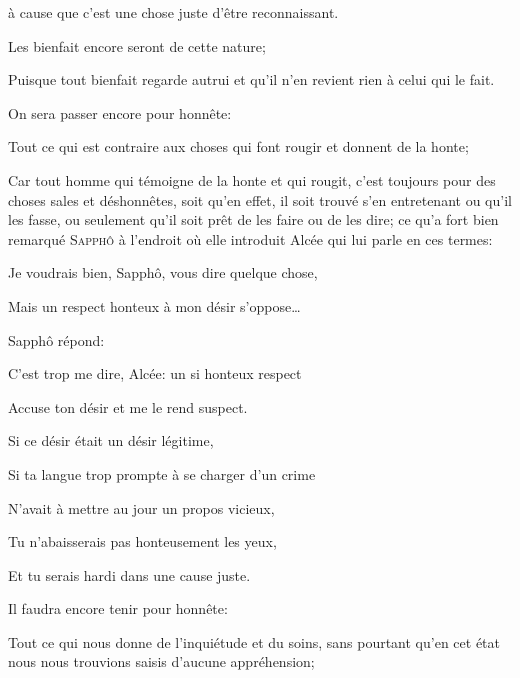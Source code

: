 à cause que c'est une chose juste d'être reconnaissant.

\begin{lieu}
	Les bienfait encore seront de cette nature;
\end{lieu}

Puisque tout bienfait regarde autrui et qu'il n'en revient rien à celui qui le fait.

\bigbreak

On sera passer encore pour honnête:

\begin{lieu}
	Tout ce qui est contraire aux choses qui font rougir et donnent de la honte;
\end{lieu}

Car tout homme qui témoigne de la honte et qui rougit, c'est toujours pour des choses sales et déshonnêtes, soit qu'en
effet, il soit trouvé s'en entretenant ou qu'il les fasse, ou seulement qu'il soit prêt de les faire ou de les dire; ce
qu'a fort bien remarqué \textsc{Sapphô} à l'endroit où elle introduit Alcée qui lui parle en ces termes:

\begin{emphpar}
	Je voudrais bien, Sapphô, vous dire quelque chose,
	
	Mais un respect honteux à mon désir s'oppose\dots
\end{emphpar}

Sapphô répond:

\begin{emphpar}
	C'est trop me dire, Alcée: un si honteux respect

	Accuse ton désir et me le rend suspect.

	Si ce désir était un désir légitime,

	Si ta langue trop prompte à se charger d'un crime

	N'avait à mettre au jour un propos vicieux,

	Tu n'abaisserais pas honteusement les yeux,

	Et tu serais hardi dans une cause juste. 
\end{emphpar}

\bigbreak

Il faudra encore tenir pour honnête:

\begin{lieu}
	Tout ce qui nous donne de l'inquiétude et du soins, sans pourtant qu'en cet état nous nous trouvions saisis
	d'aucune appréhension;
\end{lieu}

